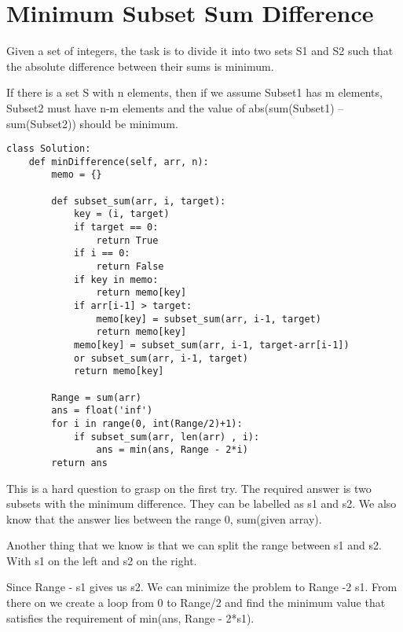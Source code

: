 \documentclass[24pt, a4]{article}
\begin{document}
\newpage
\section{Minimum Subset Sum Difference}

Given a set of integers, the task is to divide it into two sets S1 and S2 such that the absolute difference between their sums is minimum. 

If there is a set S with n elements, then if we assume Subset1 has m elements, Subset2 must have n-m elements and the value of abs(sum(Subset1) – sum(Subset2)) should be minimum.

\begin{lstlisting}
class Solution:
    def minDifference(self, arr, n):        
        memo = {}
        
        def subset_sum(arr, i, target):
            key = (i, target)
            if target == 0:
                return True
            if i == 0:
                return False
            if key in memo:
                return memo[key]
            if arr[i-1] > target:
                memo[key] = subset_sum(arr, i-1, target)
                return memo[key]
            memo[key] = subset_sum(arr, i-1, target-arr[i-1]) 
            or subset_sum(arr, i-1, target)
            return memo[key]
        
        Range = sum(arr)
        ans = float('inf')
        for i in range(0, int(Range/2)+1):
            if subset_sum(arr, len(arr) , i):
                ans = min(ans, Range - 2*i)
        return ans
\end{lstlisting}

This is a hard question to grasp on the first try. The required answer is two subsets with the minimum difference. They can be labelled as s1 and s2. We also know that the answer lies between the range 0, sum(given array).

Another thing that we know is that we can split the range between s1 and s2. With s1 on the left and s2 on the right.

Since Range - s1 gives us s2. We can minimize the problem to Range -2 s1. From there on we create a loop from 0 to Range/2 and find the minimum value that satisfies the requirement of min(ans, Range - 2*s1).

\newpage
\end{document}
